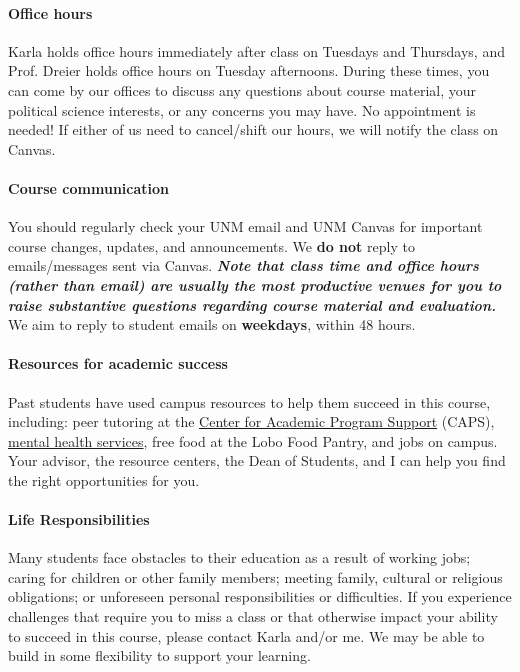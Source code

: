 \documentclass[11pt]{article}
\begin{document}
\paragraph{Office hours} Karla holds office hours immediately after class on Tuesdays and Thursdays, and Prof. Dreier holds office hours on Tuesday afternoons. During these times, you can come by our offices to discuss any questions about course material, your political science interests, or any concerns you may have. No appointment is needed! If either of us need to cancel/shift our hours, we will notify the class on Canvas.

\paragraph{Course communication}
You should regularly check your UNM email and UNM Canvas for important course changes, updates, and announcements. We\textbf{ do not} reply to emails/messages sent via Canvas. \textbf{\textit{Note that class time and office hours (rather than email) are usually the most productive venues for you to raise substantive questions regarding course material and evaluation.}} We aim to reply to student emails on \textbf{weekdays}, within 48 hours.

\paragraph{Resources for academic success} Past students have used campus resources to help them succeed in this course, including: peer tutoring at the \href{https://caps.unm.edu/}{Center for Academic Program Support} (CAPS),  \href{http://mentalhealth.unm.edu}{mental health services}, free food at the Lobo Food Pantry, and jobs on campus. Your advisor, the resource centers, the Dean of Students, and I can help you find the right opportunities for you.

\paragraph{Life Responsibilities}
Many students face obstacles to their education as a result of working jobs; caring for children or other family members; meeting family, cultural or religious obligations; or unforeseen personal responsibilities or difficulties. If you experience challenges that require you to miss a class or that otherwise impact your ability to succeed in this course, please contact Karla and/or me. We may be able to build in some flexibility to support your learning.
\end{document}
